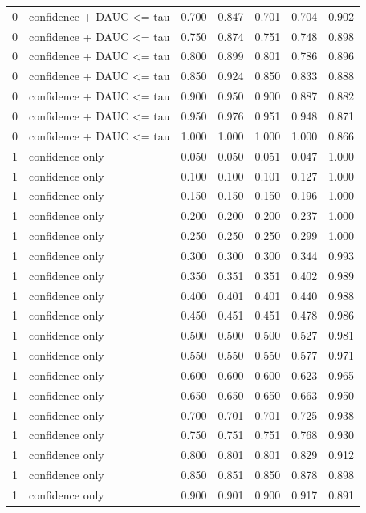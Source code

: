 \begin{tabular}{rlrrrrr}
0 & confidence + DAUC <= tau & 0.700 & 0.847 & 0.701 & 0.704 & 0.902 \\
0 & confidence + DAUC <= tau & 0.750 & 0.874 & 0.751 & 0.748 & 0.898 \\
0 & confidence + DAUC <= tau & 0.800 & 0.899 & 0.801 & 0.786 & 0.896 \\
0 & confidence + DAUC <= tau & 0.850 & 0.924 & 0.850 & 0.833 & 0.888 \\
0 & confidence + DAUC <= tau & 0.900 & 0.950 & 0.900 & 0.887 & 0.882 \\
0 & confidence + DAUC <= tau & 0.950 & 0.976 & 0.951 & 0.948 & 0.871 \\
0 & confidence + DAUC <= tau & 1.000 & 1.000 & 1.000 & 1.000 & 0.866 \\
1 & confidence only & 0.050 & 0.050 & 0.051 & 0.047 & 1.000 \\
1 & confidence only & 0.100 & 0.100 & 0.101 & 0.127 & 1.000 \\
1 & confidence only & 0.150 & 0.150 & 0.150 & 0.196 & 1.000 \\
1 & confidence only & 0.200 & 0.200 & 0.200 & 0.237 & 1.000 \\
1 & confidence only & 0.250 & 0.250 & 0.250 & 0.299 & 1.000 \\
1 & confidence only & 0.300 & 0.300 & 0.300 & 0.344 & 0.993 \\
1 & confidence only & 0.350 & 0.351 & 0.351 & 0.402 & 0.989 \\
1 & confidence only & 0.400 & 0.401 & 0.401 & 0.440 & 0.988 \\
1 & confidence only & 0.450 & 0.451 & 0.451 & 0.478 & 0.986 \\
1 & confidence only & 0.500 & 0.500 & 0.500 & 0.527 & 0.981 \\
1 & confidence only & 0.550 & 0.550 & 0.550 & 0.577 & 0.971 \\
1 & confidence only & 0.600 & 0.600 & 0.600 & 0.623 & 0.965 \\
1 & confidence only & 0.650 & 0.650 & 0.650 & 0.663 & 0.950 \\
1 & confidence only & 0.700 & 0.701 & 0.701 & 0.725 & 0.938 \\
1 & confidence only & 0.750 & 0.751 & 0.751 & 0.768 & 0.930 \\
1 & confidence only & 0.800 & 0.801 & 0.801 & 0.829 & 0.912 \\
1 & confidence only & 0.850 & 0.851 & 0.850 & 0.878 & 0.898 \\
1 & confidence only & 0.900 & 0.901 & 0.900 & 0.917 & 0.891 \\

\end{tabular}
